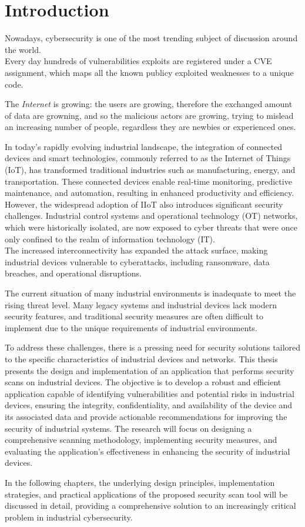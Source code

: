 \chapter{Introduction}
\label{cha:intro}

Nowadays, cybersecurity is one of the most trending subject of discussion around the world.\\
Every day hundreds of vulnerabilities exploits are registered under a CVE assignment, which maps all the known publicy exploited weaknesses to a unique code.

The \textit{Internet} is growing: the users are growing, therefore the exchanged amount of data are growning, and so the malicious actors are growing, trying to mislead an increasing number of people, regardless they are newbies or experienced ones.

In today's rapidly evolving industrial landscape, the integration of connected devices and smart technologies, commonly referred to as the Internet of Things (IoT), has transformed traditional industries such as manufacturing, energy, and transportation. These connected devices enable real-time monitoring, predictive maintenance, and automation, resulting in enhanced productivity and efficiency. \\
However, the widespread adoption of IIoT also introduces significant security challenges. Industrial control systems and operational technology (OT) networks, which were historically isolated, are now exposed to cyber threats that were once only confined to the realm of information technology (IT). \\
The increased interconnectivity has expanded the attack surface, making industrial devices vulnerable to cyberattacks, including ransomware, data breaches, and operational disruptions.

The current situation of many industrial environments is inadequate to meet the rising threat level. Many legacy systems and industrial devices lack modern security features, and traditional security measures are often difficult to implement due to the unique requirements of industrial environments.

To address these challenges, there is a pressing need for security solutions tailored to the specific characteristics of industrial devices and networks. This thesis presents the design and implementation of an application that performs security scans on industrial devices. The objective is to develop a robust and efficient application capable of identifying vulnerabilities and potential risks in industrial devices, ensuring the integrity, confidentiality, and availability of the device and its associated data and provide actionable recommendations for improving the security of industrial systems. The research will focus on designing a comprehensive scanning methodology, implementing security measures, and evaluating the application's effectiveness in enhancing the security of industrial devices. 

In the following chapters, the underlying design principles, implementation strategies, and practical applications of the proposed security scan tool will be discussed in detail, providing a comprehensive solution to an increasingly critical problem in industrial cybersecurity.
